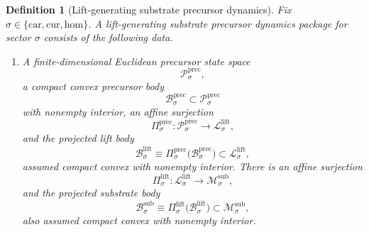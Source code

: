 \documentclass[11pt]{article}
\newcommand{\Car}{\mathrm{car}}
\newcommand{\Cur}{\mathrm{cur}}
\newcommand{\Hom}{\mathrm{hom}}
\newcommand{\SubSpace}[1]{\mathcal M_{#1}^{\mathrm{sub}}}
\newcommand{\SubBody}[1]{\mathcal B_{#1}^{\mathrm{sub}}}
\newcommand{\LiftSpace}[1]{\mathcal L_{#1}^{\mathrm{lift}}}
\newcommand{\LiftBody}[1]{\mathcal B_{#1}^{\mathrm{lift}}}
\newcommand{\LiftProj}[1]{\Pi_{#1}^{\mathrm{lift}}}
\newcommand{\PrecSpace}[1]{\mathcal P_{#1}^{\mathrm{prec}}}
\newcommand{\PrecBody}[1]{\mathcal B_{#1}^{\mathrm{prec}}}
\newcommand{\PrecProj}[1]{\Pi_{#1}^{\mathrm{prec}}}
\newtheorem{definition}{Definition}
\begin{document}
\begin{definition}[Lift-generating substrate precursor dynamics]
\label{def:prec}
Fix \(\sigma\in\{\Car,\Cur,\Hom\}\). A \emph{lift-generating substrate precursor dynamics package} for sector \(\sigma\) consists of the following data.
\begin{enumerate}
    \item A finite-dimensional Euclidean precursor state space
    \[
    \PrecSpace{\sigma},
    \]
    a compact convex precursor body
    \[
    \PrecBody{\sigma}\subset\PrecSpace{\sigma}
    \]
    with nonempty interior, an affine surjection
    \[
    \PrecProj{\sigma}:\PrecSpace{\sigma}\to\LiftSpace{\sigma},
    \]
    and the projected lift body
    \[
    \LiftBody{\sigma}
    \equiv
    \PrecProj{\sigma}\bigl(\PrecBody{\sigma}\bigr)
    \subset\LiftSpace{\sigma},
    \]
    assumed compact convex with nonempty interior. There is an affine surjection
    \[
    \LiftProj{\sigma}:\LiftSpace{\sigma}\to\SubSpace{\sigma},
    \]
    and the projected substrate body
    \[
    \SubBody{\sigma}
    \equiv
    \LiftProj{\sigma}\bigl(\LiftBody{\sigma}\bigr)
    \subset\SubSpace{\sigma},
    \]
    also assumed compact convex with nonempty interior.


\end{enumerate}
\end{definition}
\end{document}
